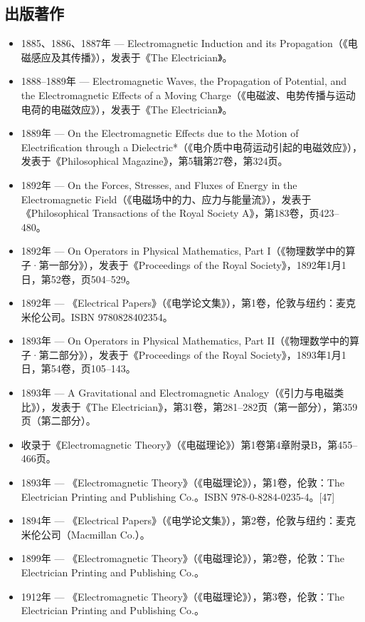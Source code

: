 \subsection{出版著作}
\begin{itemize}
\item 1885、1886、1887年 — Electromagnetic Induction and its Propagation（《电磁感应及其传播》），发表于《The Electrician》。
\item 1888–1889年 — Electromagnetic Waves, the Propagation of Potential, and the Electromagnetic Effects of a Moving Charge（《电磁波、电势传播与运动电荷的电磁效应》），发表于《The Electrician》。
\item 1889年 — On the Electromagnetic Effects due to the Motion of Electrification through a Dielectric*（《电介质中电荷运动引起的电磁效应》），发表于《Philosophical Magazine》，第5辑第27卷，第324页。
\item 1892年 — On the Forces, Stresses, and Fluxes of Energy in the Electromagnetic Field（《电磁场中的力、应力与能量流》），发表于《Philosophical Transactions of the Royal Society A》，第183卷，页423–480。
\item 1892年 — On Operators in Physical Mathematics, Part I（《物理数学中的算子·第一部分》），发表于《Proceedings of the Royal Society》，1892年1月1日，第52卷，页504–529。
\item 1892年 — 《Electrical Papers》（《电学论文集》），第1卷，伦敦与纽约：麦克米伦公司。ISBN 9780828402354。
\item 1893年 — On Operators in Physical Mathematics, Part II（《物理数学中的算子·第二部分》），发表于《Proceedings of the Royal Society》，1893年1月1日，第54卷，页105–143。
\item 1893年 — A Gravitational and Electromagnetic Analogy（《引力与电磁类比》），发表于《The Electrician》，第31卷，第281–282页（第一部分），第359页（第二部分）。
\item 收录于《Electromagnetic Theory》（《电磁理论》）第1卷第4章附录B，第455–466页。
\item 1893年 — 《Electromagnetic Theory》（《电磁理论》），第1卷，伦敦：The Electrician Printing and Publishing Co.。ISBN 978-0-8284-0235-4。[47]
\item 1894年 — 《Electrical Papers》（《电学论文集》），第2卷，伦敦与纽约：麦克米伦公司（Macmillan Co.）。
\item 1899年 — 《Electromagnetic Theory》（《电磁理论》），第2卷，伦敦：The Electrician Printing and Publishing Co.。
\item 1912年 — 《Electromagnetic Theory》（《电磁理论》），第3卷，伦敦：The Electrician Printing and Publishing Co.。

\end{itemize}
